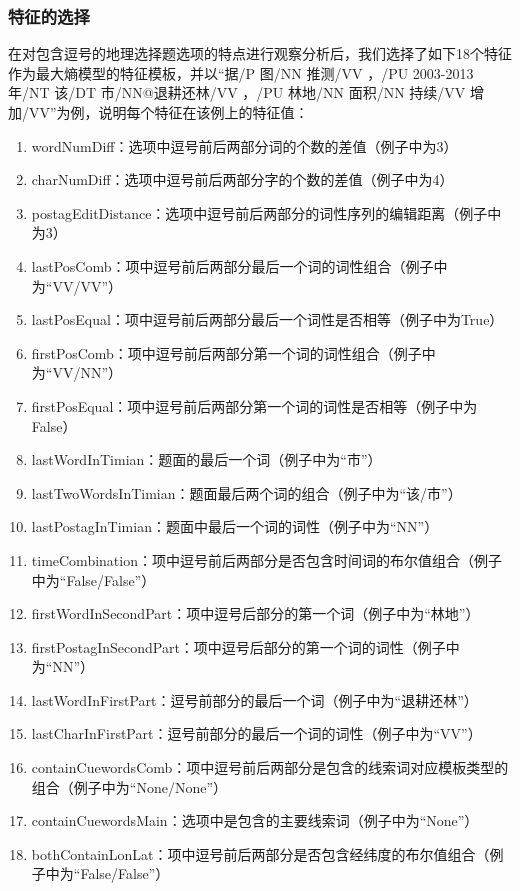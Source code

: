 \documentclass[master, winfont]{njuthesis}
\begin{document}
\subsubsection{特征的选择}
\label{featuresection}
在对包含逗号的地理选择题选项的特点进行观察分析后，我们选择了如下18个特征作为最大熵模型\cite{MaxEnt1996}\cite{Ratnaparkhi1996A}的特征模板，并以“据/P 图/NN 推测/VV ，/PU 2003-2013年/NT 该/DT 市/NN@退耕还林/VV ，/PU 林地/NN 面积/NN 持续/VV 增加/VV”为例，说明每个特征在该例上的特征值：
\begin{enumerate}
  \item wordNumDiff：选项中逗号前后两部分词的个数的差值（例子中为3）
  \item charNumDiff：选项中逗号前后两部分字的个数的差值（例子中为4）
  \item postagEditDistance：选项中逗号前后两部分的词性序列的编辑距离（例子中为3）
  \item lastPosComb：项中逗号前后两部分最后一个词的词性组合（例子中为“VV/VV”）
  \item lastPosEqual：项中逗号前后两部分最后一个词性是否相等（例子中为True）
  \item firstPosComb：项中逗号前后两部分第一个词的词性组合（例子中为“VV/NN”）
  \item firstPosEqual：项中逗号前后两部分第一个词的词性是否相等（例子中为False）
  \item lastWordInTimian：题面的最后一个词（例子中为“市”）
  \item lastTwoWordsInTimian：题面最后两个词的组合（例子中为“该/市”）
  \item lastPostagInTimian：题面中最后一个词的词性（例子中为“NN”）
  \item timeCombination：项中逗号前后两部分是否包含时间词的布尔值组合（例子中为“False/False”）
  \item firstWordInSecondPart：项中逗号后部分的第一个词（例子中为“林地”）
  \item firstPostagInSecondPart：项中逗号后部分的第一个词的词性（例子中为“NN”）
  \item lastWordInFirstPart：逗号前部分的最后一个词（例子中为“退耕还林”）
  \item lastCharInFirstPart：逗号前部分的最后一个词的词性（例子中为“VV”）
  \item containCuewordsComb：项中逗号前后两部分是包含的线索词对应模板类型的组合（例子中为“None/None”）
  \item containCuewordsMain：选项中是包含的主要线索词（例子中为“None”）
  \item bothContainLonLat：项中逗号前后两部分是否包含经纬度的布尔值组合（例子中为“False/False”）
\end{enumerate}
\end{document}
